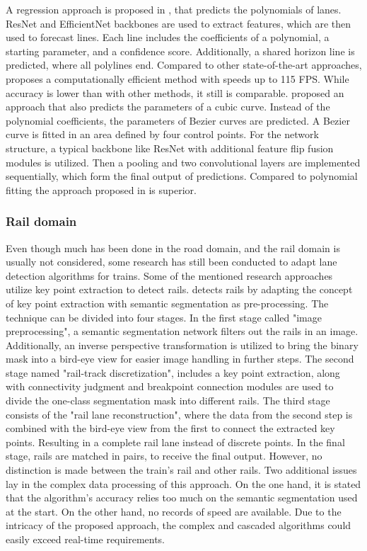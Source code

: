 A regression approach is proposed in \cite{PolyLaneNetRoad2021}, that predicts the polynomials of lanes.
ResNet and EfficientNet backbones are used to extract features, which are then used to forecast lines.
Each line includes the coefficients of a polynomial, a starting parameter, and a confidence score.
Additionally, a shared horizon line is predicted, where all polylines end.
Compared to other state-of-the-art approaches, \cite{PolyLaneNetRoad2021} proposes a computationally efficient method with speeds up to 115 \ac{FPS}.
While accuracy is lower than with other methods, it still is comparable.
\cite{DetectingLanesWithBezierCurves2023} proposed an approach that also predicts the parameters of a cubic curve.
Instead of the polynomial coefficients, the parameters of Bezier curves are predicted.
A Bezier curve is fitted in an area defined by four control points.
For the network structure, a typical backbone like ResNet with additional feature flip fusion modules is utilized.
Then a pooling and two convolutional layers are implemented sequentially, which form the final output of predictions.
Compared to polynomial fitting the approach proposed in \cite{DetectingLanesWithBezierCurves2023} is superior.

\subsubsection{Rail domain}

Even though much has been done in the road domain, and the rail domain is usually not considered, some research has still been conducted to adapt lane detection algorithms for trains.
Some of the mentioned research approaches utilize key point extraction to detect rails.
\cite{topologyGuidedRailDetection2022} detects rails by adapting the concept of key point extraction with semantic segmentation as pre-processing.
The technique can be divided into four stages.
In the first stage called "image preprocessing", a semantic segmentation network filters out the rails in an image.
Additionally, an inverse perspective transformation is utilized to bring the binary mask into a bird-eye view for easier image handling in further steps.
The second stage named "rail-track discretization", includes a key point extraction, along with connectivity judgment and breakpoint connection modules are used to divide the one-class segmentation mask into different rails.
The third stage consists of the "rail lane reconstruction", where the data from the second step is combined with the bird-eye view from the first to connect the extracted key points. Resulting in a complete rail lane instead of discrete points.
In the final stage, rails are matched in pairs, to receive the final output.
However, no distinction is made between the train's rail and other rails.
Two additional issues lay in the complex data processing of this approach.
On the one hand, it is stated that the algorithm's accuracy relies too much on the semantic segmentation used at the start.
On the other hand, no records of speed are available.
Due to the intricacy of the proposed approach, the complex and cascaded algorithms could easily exceed real-time requirements.

